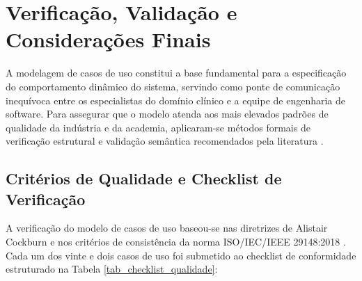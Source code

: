 \chapter{Verificação, Validação e Considerações Finais}
\label{cap_verificacao_validacao}

A modelagem de casos de uso constitui a base fundamental para a especificação do comportamento dinâmico do sistema, servindo como ponte de comunicação inequívoca entre os especialistas do domínio clínico e a equipe de engenharia de software. Para assegurar que o modelo atenda aos mais elevados padrões de qualidade da indústria e da academia, aplicaram-se métodos formais de verificação estrutural e validação semântica recomendados pela literatura \cite{cockburn2000, iso29148}.

\section{Critérios de Qualidade e Checklist de Verificação}
\label{sec_criterios_qualidade}

A verificação do modelo de casos de uso baseou-se nas diretrizes de Alistair Cockburn \cite{cockburn2000} e nos critérios de consistência da norma ISO/IEC/IEEE 29148:2018 \cite{iso29148}. Cada um dos vinte e dois casos de uso foi submetido ao checklist de conformidade estruturado na Tabela \ref{tab_checklist_qualidade}:

